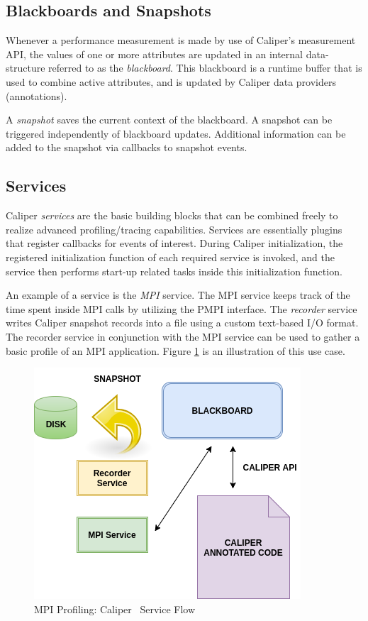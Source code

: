 \subsection{Blackboards and Snapshots}
Whenever a performance measurement is made by use of Caliper's measurement API, the values of one or more attributes are updated in an internal data-structure referred to as the \textit{blackboard}. This blackboard is a runtime buffer that is used to combine active attributes, and is updated by Caliper data providers (annotations).
\par A \textit{snapshot} saves the current context of the blackboard. A snapshot can be triggered independently of blackboard updates. Additional information can be added to the snapshot via callbacks to snapshot events. 
\subsection{Services}
Caliper \emph{services} are the basic building blocks that can be combined freely to realize advanced profiling/tracing capabilities. Services are essentially plugins that register callbacks for events of interest. During Caliper initialization, the registered initialization function of each required service is invoked, and the service then performs start-up related tasks inside this initialization function. 
\par An example of a service is the \textit{MPI} service. The MPI service keeps track of the time spent inside MPI calls by utilizing the PMPI interface. The \textit{recorder} service writes Caliper snapshot records into a file using a custom text-based I/O format. The recorder service in conjunction with the MPI service can be used to gather a basic profile of an MPI application. Figure \ref{fig:caliservices} is an illustration of this use case. 
\begin{center}
	\begin{figure}[bp!]
         \centering
  \captionsetup{justification=centering}
		\includegraphics[scale=0.7, keepaspectratio]{figures/cali-services}
		\caption{MPI Profiling: Caliper~\cite{CALIPER} Service Flow}
		\label{fig:caliservices}
	\end{figure}
\end{center}

